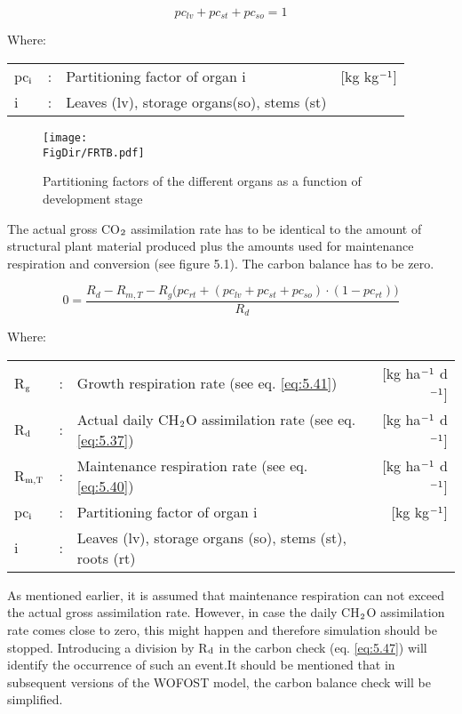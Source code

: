 \begin{equation}
pc_{lv} + pc_{st} + pc_{so} = 1
\end{equation}

Where:\\[5pt]
\begin{tabularx}{\textwidth}{llXr}
	pc$_{{\rm i}}$ &:& Partitioning factor of organ i   &
	[kg kg$^{{\rm -1}}$]\\
	i &:& Leaves (lv), storage organs(so), stems (st)
\end{tabularx}

\begin{figure}[p]
	\centering
	\texttt{[image: \\FigDir/FRTB.pdf]}
	\caption{Partitioning factors of the different organs as a function of development stage}
	\label{fig:partitioning}
\end{figure}

The actual gross CO$_{{\rm 2}}$ assimilation rate has to be identical to the amount of structural plant
material produced plus the amounts used for maintenance respiration and conversion (see
figure 5.1). The carbon balance has to be zero. 

\begin{equation}
\label{eq:5.47}
0 = {\frac{R_{d} - R_{m,T} - R_{g} \big( pc_{rt} + (pc_{lv} + pc_{st} + pc_{so}) \cdot (1 - pc_{rt}) \big) }{R_d}}  
\end{equation}

Where:\\[5pt]
\begin{tabularx}{\textwidth}{llXr}
	R$_{{\rm g}}$ &:& Growth respiration rate (see eq. \ref{eq:5.41})   &
	[kg ha$^{{\rm -1}}$ d$^{{\rm -1}}$]\\
	R$_{{\rm d}}$ &:& Actual daily CH$_{{\rm 2}}$O assimilation rate (see eq. \ref{eq:5.37})   &
	[kg ha$^{{\rm -1}}$ d$^{{\rm -1}}$]\\
	R$_{{\rm m,T}}$ &:& Maintenance respiration rate (see eq. \ref{eq:5.40})   &
	[kg ha$^{{\rm -1}}$ d$^{{\rm -1}}$]\\
	pc$_{{\rm i}}$ &:& Partitioning factor of organ i    &
	[kg kg$^{{\rm -1}}$]\\
	i &:& Leaves (lv), storage organs (so), stems (st), roots (rt)\\
\end{tabularx}

As mentioned earlier, it is assumed that maintenance respiration can not exceed the actual
gross assimilation rate. However, in case the daily CH$_{{\rm 2}}$O assimilation rate comes close to
zero, this might happen and therefore simulation should be stopped. Introducing a
division by R$_{{\rm d}}$ in the carbon check (eq. \ref{eq:5.47}) will identify the occurrence of such an
event.It should be mentioned that in subsequent versions of the WOFOST model, the carbon
balance check will be simplified.

